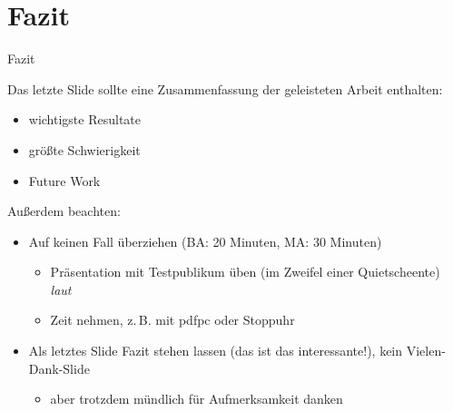 \section{Fazit}

\begin{frame}{Fazit}

  Das letzte Slide sollte eine Zusammenfassung der geleisteten Arbeit enthalten:
  \begin{itemize}
    \item wichtigste Resultate
    \item größte Schwierigkeit
    \item Future Work
  \end{itemize}
    
  Außerdem beachten:
  \begin{itemize}
    \item Auf keinen Fall überziehen (BA: 20 Minuten, MA: 30 Minuten)
    \begin{itemize}
        \item Präsentation mit Testpublikum üben (im Zweifel einer Quietscheente) \emph{laut}
        \item Zeit nehmen, z.\,B. mit pdfpc oder Stoppuhr
    \end{itemize}
    \item Als letztes Slide Fazit stehen lassen (das ist das interessante!), kein Vielen-Dank-Slide
    \begin{itemize}
        \item aber trotzdem mündlich für Aufmerksamkeit danken
    \end{itemize}
    \end{itemize}
\end{frame}